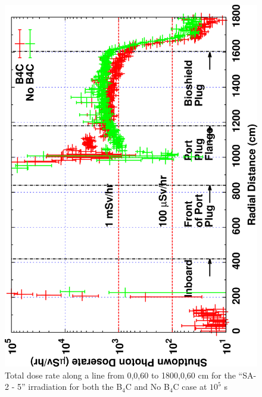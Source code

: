 \documentclass[12pt]{article}
\begin{document}
\begin{figure}[ht!]
\centering
\includegraphics[clip,scale=0.12,angle=-90]{../plots/photon_lineout/comp/10yr_dc1.png}
\caption{Total dose rate along a line from 0,0,60 to 1800,0,60 cm for the ``SA-2 - 5'' irradiation
for both the B$_4$C and No B$_4$C case at $10^5$ s}
\label{fig:photons_10y_dc1_dose}
\end{figure}
\newpage
\end{document}
